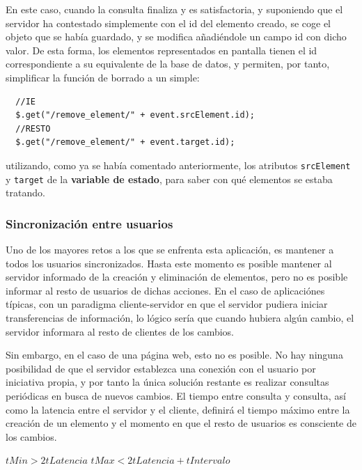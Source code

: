 En este caso, cuando la consulta finaliza y es satisfactoria, y suponiendo que el servidor ha contestado simplemente con el id del elemento creado, se coge el objeto que se había guardado, y se modifica añadiéndole un campo id con dicho valor. De esta forma, los elementos representados en pantalla tienen el id correspondiente a su equivalente de la base de datos, y permiten, por tanto, simplificar la función de borrado a un simple:

\begin{verbatim}
  //IE
  $.get("/remove_element/" + event.srcElement.id);
  //RESTO
  $.get("/remove_element/" + event.target.id);
\end{verbatim}

utilizando, como ya se había comentado anteriormente, los atributos \texttt{srcElement} y \texttt{target} de la \textbf{variable de estado}, para saber con qué elementos se estaba tratando.


\subsubsection{Sincronización entre usuarios} %
\label{ssub:sincronizacion_entre_usuarios}

Uno de los mayores retos a los que se enfrenta esta aplicación, es mantener a todos los usuarios sincronizados. Hasta este momento es posible mantener al servidor informado de la creación y eliminación de elementos, pero no es posible informar al resto de usuarios de dichas acciones. En el caso de aplicaciónes típicas, con un paradigma cliente-servidor en que el servidor pudiera iniciar transferencias de información, lo lógico sería que cuando hubiera algún cambio, el servidor informara al resto de clientes de los cambios.

Sin embargo, en el caso de una página web, esto no es posible. No hay ninguna posibilidad de que el servidor establezca una conexión con el usuario por iniciativa propia, y por tanto la única solución restante es realizar consultas periódicas en busca de nuevos cambios. El tiempo entre consulta y consulta, así como la latencia entre el servidor y el cliente, definirá el tiempo máximo entre la creación de un elemento y el momento en que el resto de usuarios es consciente de los cambios.

$tMin > 2tLatencia$
$tMax < 2tLatencia + tIntervalo$


